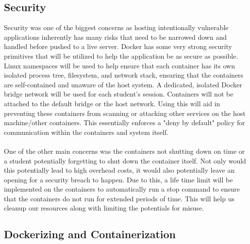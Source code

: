 \documentclass[12pt]{article}
\begin{document}
\subsection{Security}
Security was one of the biggest concerns as hosting intentionally vulnerable applications inherently has many risks that need to be narrowed down and handled before pushed to a live server. Docker has some very strong security primitives that will be utilized to help the application be as secure as possible. Linux namespaces will be used to help ensure that each container has its own isolated process tree, filesystem, and network stack, ensuring that the containers are self-contained and unaware of the host system. A dedicated, isolated Docker bridge network will be used for each student's session. Containers will not be attached to the default bridge or the host network. Using this will aid in preventing these containers from scanning or attacking other services on the host machine/other containers. This essentially enforces a "deny by default" policy for communication within the containers and system itself.
\\
\\
One of the other main concerns was the containers not shutting down on time or a student potentially forgetting to shut down the container itself. Not only would this potentially lead to high overhead costs, it would also potentially leave an opening for a security breach to happen. Due to this, a life time limit will be implemented on the containers to automatically run a stop command to ensure that the containers do not run for extended periods of time. This will help us cleanup our resources along with limiting the potentials for misuse.
\subsection {Dockerizing and Containerization}
\end{document}
